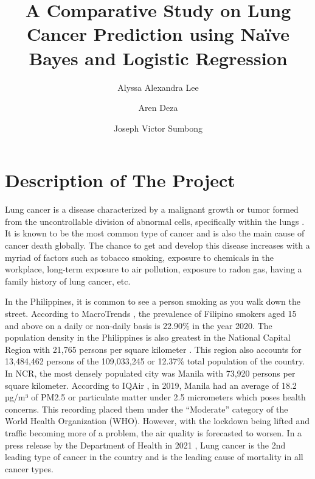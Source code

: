 \documentclass[runningheads]{llncs}
\begin{document}
\title{\textbf{\LARGE A Comparative Study on Lung Cancer Prediction using Naïve Bayes and Logistic Regression}}

\author{Alyssa Alexandra Lee\and Aren Deza\and Joseph Victor Sumbong}
\maketitle


\section{Description of The Project}
Lung cancer is a disease characterized by a malignant growth or tumor formed from the uncontrollable division of abnormal cells, specifically within the lungs \cite{cancerResearchUK2019}. It is known to be the most common type of cancer and is also the main cause of cancer death globally. The chance to get and develop this disease increases with a myriad of factors such as tobacco smoking, exposure to chemicals in the workplace, long-term exposure to air pollution, exposure to radon gas, having a family history of lung cancer, etc.

In the Philippines, it is common to see a person smoking as you walk down the street. According to MacroTrends \cite{macrotrends2022}, the prevalence of Filipino smokers aged 15 and above on a daily or non-daily basis is 22.90\% in the year 2020. The population density in the Philippines is also greatest in the National Capital Region with 21,765 persons per square kilometer \cite{philippinestatisticsauthority2021}. This region also accounts for 13,484,462 persons of the 109,033,245 or 12.37\% total population of the country. In NCR, the most densely populated city was Manila with 73,920 persons per square kilometer. According to IQAir \cite{IQAir2022}, in 2019, Manila had an average of 18.2 µg/m³ of PM2.5 or particulate matter under 2.5 micrometers which poses health concerns. This recording placed them under the “Moderate” category of the World Health Organization (WHO). However, with the lockdown being lifted and traffic becoming more of a problem, the air quality is forecasted to worsen. In a press release by the  Department of Health in 2021 \cite{doh2021}, Lung cancer is the 2nd leading type of cancer in the country and is the leading cause of mortality in all cancer types.
\end{document}
